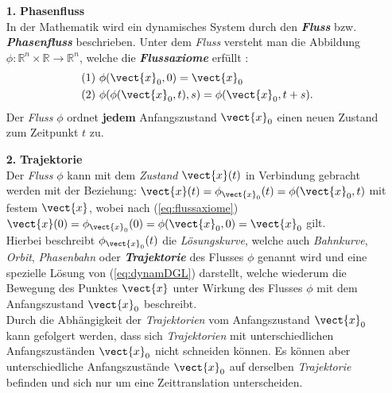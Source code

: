 \begin{itemize}
    \item[\textbf{1.}]\textbf{Phasenfluss}\\
    In der Mathematik wird ein dynamisches System durch den \textit{\textbf{Fluss}} bzw. \textit{\textbf{Phasenfluss}}  beschrieben. Unter dem \textit{Fluss} versteht man die Abbildung $\phi:\mathbb{R}^n\times\mathbb{R}\rightarrow\mathbb{R}^n$, welche die \textit{\textbf{Flussaxiome}} erfüllt \citep{Mat1}:
    \begin{gather}
        \begin{aligned}
            (1)~&\phi(\vect{x}_0,0)=\vect{x}_0\\
            (2)~&\phi(\phi(\vect{x}_0,t),s)=\phi(\vect{x}_0,t+s).
            \label{eq:flussaxiome}
        \end{aligned}
    \end{gather}
    Der \textit{Fluss} $\phi$ ordnet \textbf{jedem} Anfangszustand $\vect{x}_0$ einen neuen Zustand zum Zeitpunkt $t$ zu. \citep{Lueck}\\

    \item[\textbf{2.}]\textbf{Trajektorie}\\
    Der \textit{Fluss} $\phi$ kann mit dem \textit{Zustand} $\vect{x}(t)$ in Verbindung gebracht werden mit der Beziehung: $\vect{x}(t)=\phi_{\vect{x}_0}(t)=\phi(\vect{x}_0,t)$ mit festem $\vect{x}$, wobei nach  (\ref{eq:flussaxiome}) $\vect{x}(0)=\phi_{\vect{x}_0}(0)=\phi(\vect{x}_0,0)=\vect{x}_0$ gilt.\\
    Hierbei beschreibt $\phi_{\vect{x}_0}(t)$ die \textit{Lösungskurve}, welche auch \textit{Bahnkurve}, \textit{Orbit}, \textit{Phasenbahn} oder \textit{\textbf{Trajektorie}} des Flusses $\phi$ genannt wird und eine spezielle Lösung von (\ref{eq:dynamDGL}) darstellt, welche wiederum die Bewegung des Punktes $\vect{x}$ unter Wirkung des Flusses $\phi$ mit dem Anfangszustand $\vect{x}_0$ beschreibt. \citep{Lueck}\\
    Durch die Abhängigkeit der \textit{Trajektorien} vom Anfangszustand $\vect{x}_0$ kann gefolgert werden, dass sich \textit{Trajektorien} mit unterschiedlichen Anfangszuständen $\vect{x}_0$ nicht schneiden können. Es können aber unterschiedliche Anfangszustände $\vect{x}_0$ auf derselben \textit{Trajektorie} befinden und sich nur um eine Zeittranslation unterscheiden. \citep{Mat1}\\


\end{itemize}
